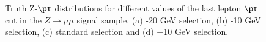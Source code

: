 \begin{figure}[htbp]
	\centering
	\hfill
	\caption{Truth Z-$\pt$ distributions for different values of the last lepton $\pt$ cut in the $Z\to\mu\mu$ signal sample. (a) -20 GeV selection, (b) -10 GeV selection, (c) standard selection and (d) +10 GeV selection.}
	\label{Fig14}
\end{figure}





